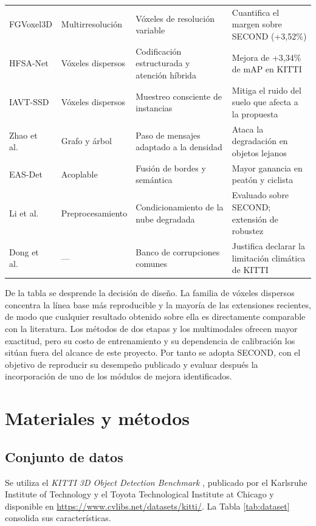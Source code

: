 \documentclass[11pt,letterpaper]{article}
\begin{document}
\begin{table}[htbp]
\begin{tabular}{@{}>{\raggedright\arraybackslash}p{2.6cm}>{\raggedright\arraybackslash}p{2.1cm}>{\raggedright\arraybackslash}p{4.6cm}>{\raggedright\arraybackslash}p{6.1cm}@{}}
FGVoxel3D \cite{ao2026} & Multirresolución & Vóxeles de resolución variable & Cuantifica el margen sobre SECOND (+3,52\%) \\
HFSA-Net \cite{yin2026} & Vóxeles dispersos & Codificación estructurada y atención híbrida & Mejora de +3,34\% de mAP en KITTI \\
IAVT-SSD \cite{wang2025iavt} & Vóxeles dispersos & Muestreo consciente de instancias & Mitiga el ruido del suelo que afecta a la propuesta \\
Zhao et al.\ \cite{zhao2025} & Grafo y árbol & Paso de mensajes adaptado a la densidad & Ataca la degradación en objetos lejanos \\
EAS-Det \cite{wang2025eas} & Acoplable & Fusión de bordes y semántica & Mayor ganancia en peatón y ciclista \\
Li et al.\ \cite{li2026} & Preprocesamiento & Condicionamiento de la nube degradada & Evaluado sobre SECOND; extensión de robustez \\
Dong et al.\ \cite{dong2023} & --- & Banco de corrupciones comunes & Justifica declarar la limitación climática de KITTI \\
\bottomrule
\end{tabular}
\end{table}

De la tabla se desprende la decisión de diseño. La familia de vóxeles dispersos concentra la línea base más reproducible y la mayoría de las extensiones recientes, de modo que cualquier resultado obtenido sobre ella es directamente comparable con la literatura. Los métodos de dos etapas y los multimodales ofrecen mayor exactitud, pero su costo de entrenamiento y su dependencia de calibración los sitúan fuera del alcance de este proyecto. Por tanto se adopta SECOND, con el objetivo de reproducir su desempeño publicado y evaluar después la incorporación de uno de los módulos de mejora identificados.

\section{Materiales y métodos}

\subsection{Conjunto de datos}

Se utiliza el \textit{KITTI 3D Object Detection Benchmark} \cite{geiger2013}, publicado por el Karlsruhe Institute of Technology y el Toyota Technological Institute at Chicago y disponible en \url{https://www.cvlibs.net/datasets/kitti/}. La Tabla \ref{tab:dataset} consolida sus características.
\end{document}
